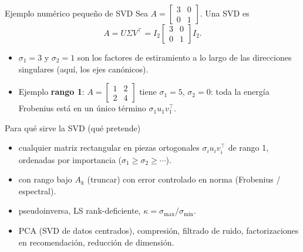 \begin{frame}{Ejemplo numérico pequeño de SVD}
Sea \(\displaystyle A=\begin{bmatrix}3&0\\0&1\end{bmatrix}\). Una SVD es
\[
  A = U\Sigma V^\top = I_2 \begin{bmatrix}3&0\\0&1\end{bmatrix} I_2.
\]
\begin{itemize}\small
  \item \(\sigma_1=3\) y \(\sigma_2=1\) son los factores de estiramiento a lo largo de las direcciones singulares (aquí, los ejes canónicos).
  \item Ejemplo \textbf{rango 1}: \(\displaystyle A=\begin{bmatrix}1&2\\2&4\end{bmatrix}\) tiene \(\sigma_1=5\), \(\sigma_2=0\): toda la energía Frobenius está en un único término \(\sigma_1 u_1 v_1^\top\).
\end{itemize}
\end{frame}

\begin{frame}{Para qué sirve la SVD (qué pretende)}
\begin{itemize}\small
  \item {} cualquier matriz rectangular en piezas ortogonales \(\sigma_i u_i v_i^\top\) de rango 1, ordenadas por importancia (\(\sigma_1\ge\sigma_2\ge\cdots\)).
  \item {} con rango bajo \(A_k\) (truncar) con error controlado en norma (Frobenius / espectral).
  \item {} pseudoinversa, LS rank-deficiente, \(\kappa=\sigma_{\max}/\sigma_{\min}\).
  \item {} PCA (SVD de datos centrados), compresión, filtrado de ruido, factorizaciones en recomendación, reducción de dimensión.
\end{itemize}
\end{frame}

